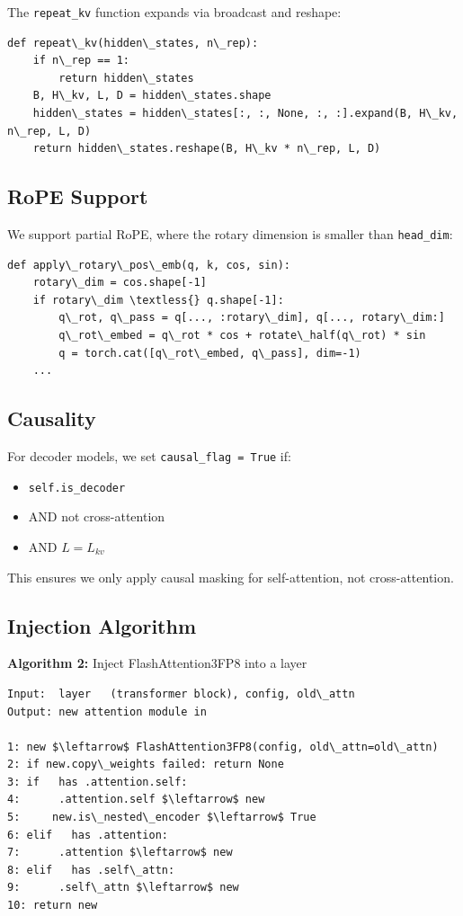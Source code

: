 The \texttt{repeat\_kv} function expands via broadcast and reshape:

\begin{lstlisting}
def repeat\_kv(hidden\_states, n\_rep):
    if n\_rep == 1:
        return hidden\_states
    B, H\_kv, L, D = hidden\_states.shape
    hidden\_states = hidden\_states[:, :, None, :, :].expand(B, H\_kv, n\_rep, L, D)
    return hidden\_states.reshape(B, H\_kv * n\_rep, L, D)
\end{lstlisting}

\subsection{RoPE Support}

We support partial RoPE, where the rotary dimension is smaller than 
\texttt{head\_dim}:

\begin{lstlisting}
def apply\_rotary\_pos\_emb(q, k, cos, sin):
    rotary\_dim = cos.shape[-1]
    if rotary\_dim \textless{} q.shape[-1]:
        q\_rot, q\_pass = q[..., :rotary\_dim], q[..., rotary\_dim:]
        q\_rot\_embed = q\_rot * cos + rotate\_half(q\_rot) * sin
        q = torch.cat([q\_rot\_embed, q\_pass], dim=-1)
    ...
\end{lstlisting}

\subsection{Causality}

For decoder models, we set \texttt{causal\_flag = True} if:
\begin{itemize}
\item \texttt{self.is\_decoder}
\item AND not cross-attention
\item AND $L = L_{kv}$

\end{itemize}
This ensures we only apply causal masking for self-attention, not 
cross-attention.

\subsection{Injection Algorithm}

\textbf{Algorithm 2:} Inject FlashAttention3FP8 into a layer
\begin{lstlisting}
Input:  layer   (transformer block), config, old\_attn
Output: new attention module in  

1: new $\leftarrow$ FlashAttention3FP8(config, old\_attn=old\_attn)
2: if new.copy\_weights failed: return None
3: if   has .attention.self:
4:      .attention.self $\leftarrow$ new
5:     new.is\_nested\_encoder $\leftarrow$ True
6: elif   has .attention:
7:      .attention $\leftarrow$ new
8: elif   has .self\_attn:
9:      .self\_attn $\leftarrow$ new
10: return new
\end{lstlisting}


